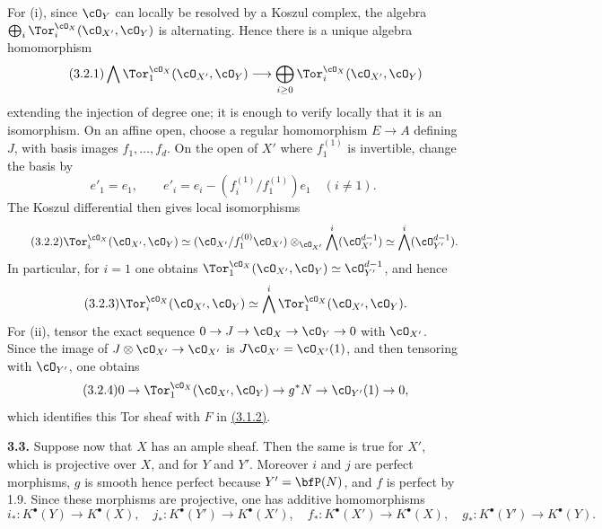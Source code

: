 For (i), since \(\cO_Y\) can locally be resolved by a Koszul complex, the algebra \(\bigoplus_i\Tor_i^{\cO_X}(\cO_{X'},\cO_Y)\) is alternating. Hence there is a unique algebra homomorphism
\begin{equation}\tag{3.2.1}
\bigwedge \Tor_1^{\cO_X}(\cO_{X'},\cO_Y)
\longrightarrow
\bigoplus_{i\ge0}\Tor_i^{\cO_X}(\cO_{X'},\cO_Y)
\end{equation}
extending the injection of degree one; it is enough to verify locally that it is an isomorphism. On an affine open, choose a regular homomorphism \(E\to A\) defining \(J\), with basis images \(f_1,\ldots,f_d\). On the open of \(X'\) where \(f_1^{(1)}\) is invertible, change the basis by
\[
e'_1=e_1,
\qquad
e'_i=e_i-(f_i^{(1)}/f_1^{(1)})e_1\quad(i\ne1).
\]
The Koszul differential then gives local isomorphisms
\begin{equation}\tag{3.2.2}
\Tor_i^{\cO_X}(\cO_{X'},\cO_Y)
\simeq
(\cO_{X'}/f_1^{(0)}\cO_{X'})\otimes_{\cO_{X'}}
\bigwedge^i(\cO_{X'}^{d-1})
\simeq
\bigwedge^i(\cO_{Y'}^{d-1}).
\end{equation}
In particular, for \(i=1\) one obtains \(\Tor_1^{\cO_X}(\cO_{X'},\cO_Y)\simeq \cO_{Y'}^{d-1}\), and hence
\begin{equation}\tag{3.2.3}
\Tor_i^{\cO_X}(\cO_{X'},\cO_Y)
\simeq
\bigwedge^i\Tor_1^{\cO_X}(\cO_{X'},\cO_Y).
\end{equation}
For (ii), tensor the exact sequence \(0\to J\to\cO_X\to\cO_Y\to0\) with \(\cO_{X'}\). Since the image of \(J\otimes\cO_{X'}\to\cO_{X'}\) is \(J\cO_{X'}=\cO_{X'}(1)\), and then tensoring with \(\cO_{Y'}\), one obtains
\begin{equation}\tag{3.2.4}
0\to \Tor_1^{\cO_X}(\cO_{X'},\cO_Y)\to g^*N\to\cO_{Y'}(1)\to0,
\end{equation}
which identifies this Tor sheaf with \(F\) in \hyperlink{sga6.e07.eq.3-1-2}{(3.1.2)}.

\textbf{3.3.} Suppose now that \(X\) has an ample sheaf. Then the same is true for \(X'\), which is projective over \(X\), and for \(Y\) and \(Y'\). Moreover \(i\) and \(j\) are perfect morphisms, \(g\) is smooth hence perfect because \(Y'=\bfP(N)\), and \(f\) is perfect by 1.9. Since these morphisms are projective, one has additive homomorphisms
\[
i_*:K^\bullet(Y)\to K^\bullet(X),\quad
j_*:K^\bullet(Y')\to K^\bullet(X'),\quad
f_*:K^\bullet(X')\to K^\bullet(X),\quad
g_*:K^\bullet(Y')\to K^\bullet(Y).
\]

